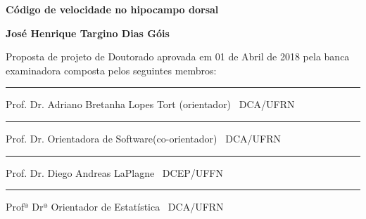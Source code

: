 %
%

\begin{titlepage}

\begin{center}

\LARGE

\textbf{Código de velocidade no hipocampo dorsal}

\vfill

\Large

\textbf{José Henrique Targino Dias Góis}

\end{center}

\vfill

\noindent
Proposta de projeto de Doutorado
aprovada em 01 de Abril de 2018 pela banca examinadora composta
pelos seguintes membros:


\begin{center}

\vspace{1.5cm}\rule{0.95\linewidth}{1pt}
\parbox{0.9\linewidth}{%
Prof. Dr. Adriano Bretanha Lopes Tort (orientador) \dotfill\ DCA/UFRN}

\vspace{1.5cm}\rule{0.95\linewidth}{1pt}
\parbox{0.9\linewidth}{%
Prof. Dr. Orientadora de Software(co-orientador) \dotfill\ DCA/UFRN}

\vspace{1.5cm}\rule{0.95\linewidth}{1pt}
\parbox{0.9\linewidth}{%
Prof. Dr. Diego Andreas LaPlagne \dotfill\ DCEP/UFFN}

\vspace{1.5cm}\rule{0.95\linewidth}{1pt}
\parbox{0.9\linewidth}{%
Profª Drª Orientador de Estatística \dotfill\ DCA/UFRN}

\end{center}

\end{titlepage}

%
%

